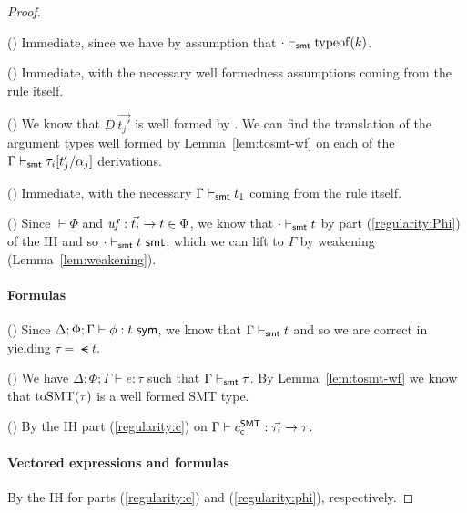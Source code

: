 \documentclass[acmsmall,screen,nonacm]{acmart}
\theoremstyle{definition}
\begin{document}
\begin{lemma}
\begin{proof}
\begin{proofcases}
  \item[(\rn{$c$-SMT-Const})] Immediate, since we have by assumption
  that $\cdot \vdash_{\mathsf{smt}} \mathrm{typeof}(k)$.

  \item[(\rn{$c$-SMT-Let})] Immediate, with the necessary well
  formedness assumptions coming from the rule itself.

  \item[(\rn{$c$-SMT-Ctor})] We know that $D ~ \vec{t_j'}$ is well
    formed by . We can find the translation of the
    argument types well formed by Lemma~\ref{lem:tosmt-wf} on each of
    the $\Gamma \vdash_{\mathsf{smt}} \tau_i[t_j'/\alpha_j]$ derivations.

  \item[(\rn{$c$-SMT-Forall})] Immediate, with the necessary
  $\Gamma \vdash_{\mathsf{smt}} t_1$ coming from the rule itself.

  \item[(\rn{$c$-SMT-UFun})] Since $\vdash \Phi$ and $\mathit{uf}
  : \vec{t_i} \rightarrow t \in \Phi$, we know that
  $\cdot \vdash_{\mathsf{smt}} t$ by part (\ref{regularity:Phi}) of the IH and
  so $\cdot \vdash_{\mathsf{smt}} {t} ~ \mathsf{smt}$, which we can lift to $\Gamma$ by
  weakening (Lemma~\ref{lem:weakening}).

\end{proofcases}

\paragraph*{Formulas}
%
\begin{proofcases}

  \item[(\rn{$\phi$-Promote})] Since $\Delta; \Phi; \Gamma \vdash \phi
  : {t} ~ \mathsf{sym}$, we know that $\Gamma \vdash_{\mathsf{smt}} t$ and so we are
  correct in yielding $\tau = \smt{t}$.

  \item[(\rn{$\phi$-Unquote})] We have $\Delta; \Phi; \Gamma \vdash e
    : \tau$ such that $\Gamma \vdash_{\mathsf{smt}} \tau$. By
    Lemma~\ref{lem:tosmt-wf} we know that $\mathrm{toSMT}(\tau)$ is a well
    formed SMT type.

  \item[(\rn{$\phi$-Ctor})] By the IH part (\ref{regularity:c}) on $\Gamma \vdash c^\mathsf{SMT}_{\mathsf{c}} : \vec{\tau_i} \rightarrow \tau$.
\end{proofcases}

\paragraph*{Vectored expressions and formulas}
%
By the IH for parts (\ref{regularity:e}) and (\ref{regularity:phi}),
respectively.

\end{proof}
\end{lemma}
\end{document}
